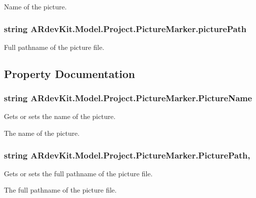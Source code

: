 Name of the picture. 

\hypertarget{class_a_rdev_kit_1_1_model_1_1_project_1_1_picture_marker_a35143cb6b2a6724b1fce695cdeac06e9}{
\subsubsection[{picture\-Path}]{\setlength{\rightskip}{0pt plus 5cm}string A\-Rdev\-Kit.\-Model.\-Project.\-Picture\-Marker.\-picture\-Path\hspace{0.3cm}{\ttfamily [protected]}}}\label{class_a_rdev_kit_1_1_model_1_1_project_1_1_picture_marker_a35143cb6b2a6724b1fce695cdeac06e9}


Full pathname of the picture file. 



\subsection{Property Documentation}
\hypertarget{class_a_rdev_kit_1_1_model_1_1_project_1_1_picture_marker_a1fcd8793ea1432d536bd08c856adf862}{
\subsubsection[{Picture\-Name}]{\setlength{\rightskip}{0pt plus 5cm}string A\-Rdev\-Kit.\-Model.\-Project.\-Picture\-Marker.\-Picture\-Name\hspace{0.3cm}{\ttfamily [get]}}}\label{class_a_rdev_kit_1_1_model_1_1_project_1_1_picture_marker_a1fcd8793ea1432d536bd08c856adf862}


Gets or sets the name of the picture. 

The name of the picture. \hypertarget{class_a_rdev_kit_1_1_model_1_1_project_1_1_picture_marker_a60a31045ce2dcc1a3a97b3e3956b1b7f}{
\subsubsection[{Picture\-Path}]{\setlength{\rightskip}{0pt plus 5cm}string A\-Rdev\-Kit.\-Model.\-Project.\-Picture\-Marker.\-Picture\-Path\hspace{0.3cm}{\ttfamily [get]}, {\ttfamily [set]}}}\label{class_a_rdev_kit_1_1_model_1_1_project_1_1_picture_marker_a60a31045ce2dcc1a3a97b3e3956b1b7f}


Gets or sets the full pathname of the picture file. 

The full pathname of the picture file. 